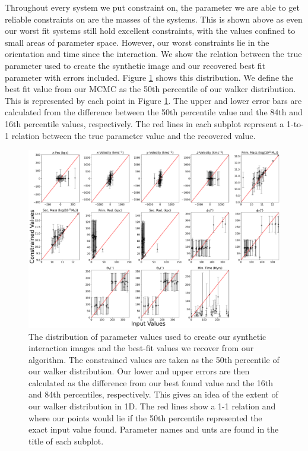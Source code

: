 Throughout every system we put constraint on, the parameter we are able to get reliable constraints on are the masses of the systems. This is shown above as even our worst fit systems still hold excellent constraints, with the values confined to small areas of parameter space. However, our worst constraints lie in the orientation and time since the interaction. We show the relation between the true parameter used to create the synthetic image and our recovered best fit parameter with errors included. Figure \ref{fig:true-found-parameters} shows this distribution. We define the best fit value from our MCMC as the 50th percentile of our walker distribution. This is represented by each point in Figure \ref{fig:true-found-parameters}. The upper and lower error bars are calculated from the difference between the 50th percentile value and the 84th and 16th percentile values, respectively. The red lines in each subplot represent a 1-to-1 relation between the true parameter value and the recovered value. 

\begin{figure}
    \centering
    \includegraphics[width=\textwidth]{Chapter1/figures/39_51.pdf}
    \caption{The distribution of parameter values used to create our synthetic interaction images and the best-fit values we recover from our algorithm. The constrained values are taken as the 50th percentile of our walker distribution. Our lower and upper errors are then calculated as the difference from our best found value and the 16th and 84th percentiles, respectively. This gives an idea of the extent of our walker distribution in 1D. The red lines show a 1-1 relation and where our points would lie if the 50th percentile represented the exact input value found. Parameter names and unts are found in the title of each subplot.}
    \label{fig:true-found-parameters}
\end{figure}

